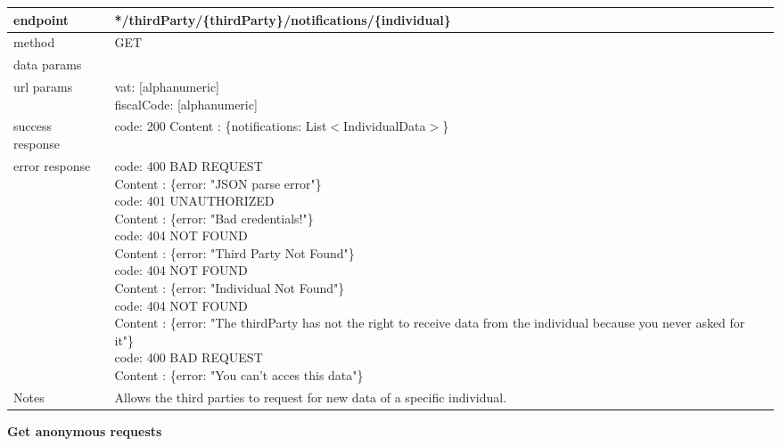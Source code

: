 	\begin{tabularx}{\linewidth}{| l| l }
		\hline
		endpoint & */thirdParty/\{thirdParty\}/notifications/\{individual\} \\
		\hline
		method & GET \\
		\hline
		data params & \\
		\hline
		url params &
		\parbox{0.7\textwidth}{
			\bigskip
			vat: [alphanumeric]\\
			fiscalCode: [alphanumeric]
			\bigskip
		} \\
		\hline
		success response &
		\parbox{0.7\textwidth}{
			\bigskip
			code: 200\\
			Content : \{notifications: List$<$IndividualData$>$\}
			\bigskip
		} \\
		\hline
		error response &
		\parbox{0.7\textwidth}{
			\bigskip
			code: 400 BAD REQUEST \\
			Content : \{error: "JSON parse error"\}\\
			code: 401 UNAUTHORIZED \\
			Content : \{error: "Bad credentials!"\}\\
			code: 404 NOT FOUND \\
			Content : \{error: "Third Party Not Found"\}\\
			code: 404 NOT FOUND \\
			Content : \{error: "Individual Not Found"\}\\
			code: 404 NOT FOUND \\
			Content : \{error: "The thirdParty has not the right to receive data from the individual because you never asked for it"\}\\
			code: 400 BAD REQUEST \\
			Content : \{error: "You can't acces this data"\}\\
			\bigskip
		} \\
		\hline
		Notes & 
		\parbox{0.7\textwidth}{
			\bigskip Allows the third parties to request for new data of a specific individual.
		\bigskip}  \\
		\hline
	\end{tabularx}
	
	\textbf{Get anonymous requests} \\

